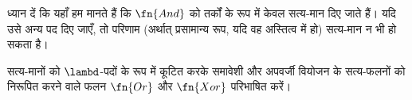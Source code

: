 \documentclass[../../../include/open-logic-section]{subfiles}
\begin{document}
ध्यान दें कि यहाँ हम मानते हैं कि $\fn{And}$ को तर्कों के रूप में केवल
सत्य-मान दिए जाते हैं। यदि उसे अन्य पद दिए जाएँ, तो परिणाम (अर्थात्
प्रसामान्य रूप, यदि वह अस्तित्व में हो) सत्य-मान न भी हो सकता है।

\begin{prob}
  सत्य-मानों को $\lambd$-पदों के रूप में कूटित करके समावेशी और अपवर्जी
  वियोजन के सत्य-फलनों को निरूपित करने वाले फलन $\fn{Or}$ और $\fn{Xor}$
  परिभाषित करें।
\end{prob}
\end{document}
